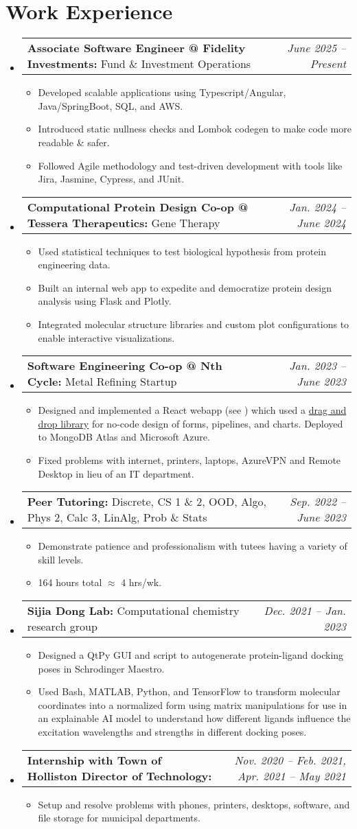 \documentclass[letterpaper,11pt]{article}
\makeatletter
\newcommand{\resumeBullet}[1]{
  \item\small{
    #1 \vspace{-2pt}
  }
}
\newcommand{\resumeSubheadingThin}[3]{
  \vspace{-1pt}\item
    \begin{tabular*}{0.97\textwidth}[t]{l@{\extracolsep{\fill}}r}
      \small\textbf{#1:} #3 & \small\textit{#2} 
    \end{tabular*}\vspace{-7pt}
}
\newcommand{\resumeSubHeadingListStart}{\begin{itemize}[leftmargin=*]}
\newcommand{\resumeSubHeadingListEnd}{\end{itemize}}
\newcommand{\resumeItemListStart}{\begin{itemize}}
\newcommand{\resumeItemListEnd}{\end{itemize}\vspace{-5pt}}
\makeatother
\begin{document}
  \section{Work Experience}
  
  \resumeSubHeadingListStart
  \resumeSubheadingThin{Associate Software Engineer @ Fidelity Investments}{June 2025 -- Present}{Fund \& Investment Operations}
  \resumeItemListStart
  \resumeBullet{Developed scalable applications using Typescript/Angular, Java/SpringBoot, SQL, and AWS.}
  \resumeBullet{Introduced static nullness checks and Lombok codegen to make code more readable \& safer.}
  \resumeBullet{Followed Agile methodology and test-driven development with tools like Jira, Jasmine, Cypress, and JUnit.}
  \resumeItemListEnd
  \resumeSubheadingThin{Computational Protein Design Co-op @ Tessera Therapeutics}{Jan. 2024 -- June 2024}{Gene Therapy}
  \resumeItemListStart
  \resumeBullet{Used statistical techniques to test biological hypothesis from protein engineering data.}
  \resumeBullet{Built an internal web app to expedite and democratize protein design analysis using Flask and Plotly.}
  \resumeBullet{Integrated molecular structure libraries and custom plot configurations to enable interactive visualizations.}
  \resumeItemListEnd
  \resumeSubheadingThin{Software Engineering Co-op @ Nth Cycle}{Jan. 2023 -- June 2023}{Metal Refining Startup}
  \resumeItemListStart
  \resumeBullet{Designed and implemented a React webapp (see \ghlink{lucas-demo-screenshots}) which used a  \href{
  https://developers.google.com/blockly}{drag and drop library} for no-code design of forms, pipelines, and charts. Deployed to MongoDB Atlas and Microsoft Azure.}

  \resumeBullet{Fixed problems with internet, printers, laptops, AzureVPN and Remote Desktop in lieu of an IT department.}
  \resumeItemListEnd
  \resumeSubheadingThin{Peer Tutoring}{Sep. 2022 -- June 2023}{Discrete, CS 1 \& 2, OOD, Algo, Phys 2, Calc 3, LinAlg, Prob \& Stats}
  \resumeItemListStart
    \resumeBullet{Demonstrate patience and professionalism with tutees having a variety of skill levels.} 
    \resumeBullet{164 hours total $\approx$ 4 hrs/wk.}
  \resumeItemListEnd
  \resumeSubheadingThin{Sijia Dong Lab}{Dec. 2021 -- Jan. 2023}{Computational
  chemistry research group} \resumeItemListStart 
  \resumeBullet{\href{
  \ghurl{automated_docking_script}}{\faIcon{link}} Designed a QtPy GUI and script to autogenerate protein-ligand docking poses in Schrodinger Maestro. }
  \resumeBullet{\href{https://doi.org/10.26434/chemrxiv-2024-cjs5j}{\faIcon{link}} Used Bash, MATLAB, Python, and TensorFlow to transform molecular coordinates into a normalized form using matrix manipulations for use in an explainable AI model to understand how different ligands influence the excitation wavelengths and strengths in different docking poses.}
\resumeItemListEnd
  \resumeSubheadingThin{Internship with Town of Holliston Director of Technology}{Nov. 2020 -- Feb. 2021, Apr. 2021 -- May 2021}{}
  \resumeItemListStart
    \resumeBullet{Setup and resolve problems with phones, printers, desktops, software, and file storage for municipal departments.}
  \resumeItemListEnd \resumeSubHeadingListEnd
\end{document}
